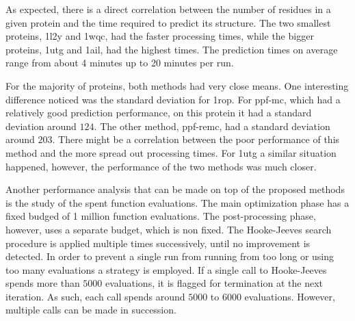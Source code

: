 As expected, there is a direct correlation between the number of residues in a
given protein and the time required to predict its structure. The two smallest
proteins, 1l2y and 1wqc, had the faster processing times, while the bigger proteins,
1utg and 1ail, had the
highest times. The prediction times on average range from about 4 minutes up to
20 minutes per run.

For the majority of proteins, both methods had very close means. One interesting
difference noticed was the standard deviation for 1rop. For ppf-mc,
which had a relatively good prediction performance, on this protein it had
a standard deviation around $124$. The other method, ppf-remc, had a
standard deviation around $203$. There might be a correlation between the
poor performance of this method and the more spread out processing times.
For 1utg a similar situation happened, however, the performance of the two
methods was much closer.

Another performance analysis that can be made on top of the proposed methods
is the study of the spent function evaluations. The main optimization phase has
a fixed budged of 1 million function evaluations. The post-processing phase,
however, uses a separate budget, which is non fixed. The Hooke-Jeeves
search procedure is applied multiple times successively, until no improvement
is detected. In order to prevent a single run from running from too long or
using too many evaluations a strategy is employed. If a single call to
Hooke-Jeeves spends more than $5000$ evaluations, it is flagged for termination
at the next iteration. As such, each call spends around $5000$ to $6000$
evaluations. However, multiple calls can be made in succession.

